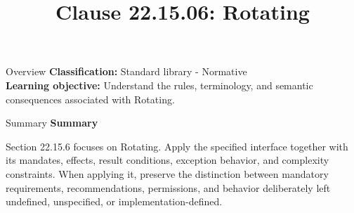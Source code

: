 \documentclass[10pt,letterpaper]{article}
\title{Clause 22.15.06: Rotating}
\author{}
\date{}
\begin{document}
\maketitle
\begin{CornellOverviewBox}{Overview}
\textbf{Classification:} Standard library - Normative\\[2pt]
\textbf{Learning objective:} Understand the rules, terminology, and semantic consequences associated with Rotating.
\end{CornellOverviewBox}\begin{CornellSummaryBox}{Summary}
{\sffamily\bfseries\color{Accent} Summary}\par\vspace{3pt}Section 22.15.6 focuses on Rotating. Apply the specified interface together with its mandates, effects, result conditions, exception behavior, and complexity constraints. When applying it, preserve the distinction between mandatory requirements, recommendations, permissions, and behavior deliberately left undefined, unspecified, or implementation-defined.
\end{CornellSummaryBox}
\end{document}

